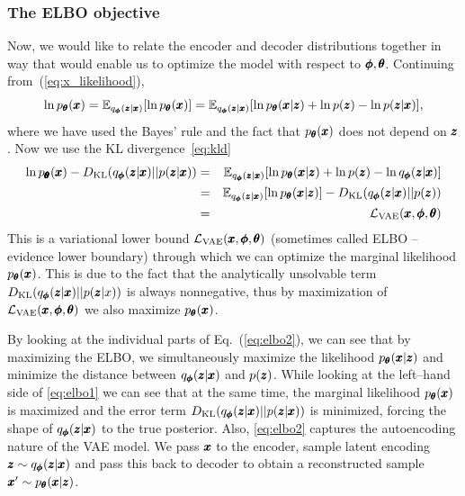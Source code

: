 \subsubsection{The ELBO objective}
Now, we would like to relate the encoder and decoder distributions together in way that would enable us to optimize the model with respect to $\pmb{{\phi}},\pmb{{\theta}}$. Continuing from~(\ref{eq:x_likelihood}),
\begin{equation}
\ln p_{\vc{\theta}}(\vc{x})=\mathbb{E}_{q_{\vc{\phi}}(\vc{z}|\vc{x})}\left[\ln p_{\vc{\theta}}(\vc{x})\right]=\mathbb{E}_{q_{\vc{\phi}}(\vc{z}|\vc{x})}\left[\ln p_{\vc{\theta}}(\vc{x}|\vc{z})+\ln p(\vc{z})-\ln p(\vc{z}|\vc{x})\right],
\end{equation}
where we have used the Bayes' rule and the fact that $p_{\pmb{{\theta}}}(\pmb{{x}})$ does not depend on $\pmb{{z}}$. Now we use the KL divergence~\eqref{eq:kld}
\begin{eqnarray}
\ln p_{\vc{\vc{\theta}}}(\vc{x})-D_{\text{KL}}\left(q_{\vc{\phi}}(\vc{z}|\vc{x})||p(\vc{z}|\vc{x})\right) & = & \mathbb{E}_{q_{\vc{\phi}}(\vc{z}|\vc{x})}\left[\ln p_{\vc{\theta}}(\vc{x}|\vc{z})+\ln p(\vc{z})-\ln q_{\vc{\phi}}(\vc{z}|\vc{x})\right]\label{eq:elbo1}\\
 & = & \mathbb{E}_{q_{\vc{\phi}}(\vc{z}|\vc{x})}\left[\ln p_{\vc{\theta}}(\vc{x}|\vc{z})\right]-D_{\text{KL}}\left(q_{\vc{\phi}}(\vc{z}|\vc{x})||p(\vc{z})\right)\label{eq:elbo2}\\
 & = & \mathcal{L}_{\text{VAE}}(\vc{x},\vc{\phi},\vc{\theta})\label{eq:elbo3}
\end{eqnarray}
This is a variational lower bound $\mathcal{L}_{\text{VAE}}(\pmb{{x}},\pmb{{\phi}},\pmb{{\theta}})$ (sometimes called ELBO -- evidence lower boundary) through which we can optimize the marginal likelihood $p_{\pmb{{\theta}}}(\pmb{{x}})$. This is due to the fact that the analytically unsolvable term $D_{\text{KL}}\left(q_{\vc{\phi}}(\vc{z}|\vc{x})||p(\vc{z}|x)\right)$ is always nonnegative, thus by maximization of $\mathcal{L}_{\text{VAE}}(\pmb{{x}},\pmb{{\phi}},\pmb{{\theta}})$ we also maximize $p_{\pmb{{\theta}}}(\pmb{{x}})$.

By looking at the individual parts of Eq.~(\ref{eq:elbo2}), we can see that by maximizing the ELBO, we simultaneously maximize the likelihood $p_{\pmb{{\theta}}}(\pmb{{x}}|\pmb{{z}})$ and minimize the distance between $q_{\pmb{{\phi}}}(\pmb{{z}}|\pmb{{x}})$ and $p(\pmb{{z}})$. While looking at the left--hand side of \eqref{eq:elbo1} we can see that at the same time, the marginal likelihood $p_{\pmb{{\theta}}}(\pmb{{x}})$ is maximized and the error term $D_{\text{KL}}\left(q_{\vc{\phi}}(\vc{z}|\vc{x})||p(\vc{z}|\vc{x})\right)$ is minimized, forcing the shape of $q_{\pmb{{\phi}}}(\pmb{{z}}|\pmb{{x}})$ to the true posterior. Also, \eqref{eq:elbo2} captures the autoencoding nature of the VAE model. We pass $\pmb{{x}}$ to the encoder, sample latent encoding $\pmb{{z}} \sim q_{\pmb{{\phi}}}(\pmb{{z}}|\pmb{{x}})$ and pass this back to decoder to obtain a reconstructed sample $\pmb{{x}}' \sim p_{\pmb{{\theta}}}(\pmb{{x}}|\pmb{{z}})$.

